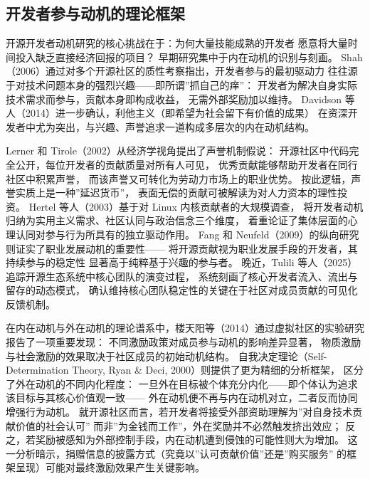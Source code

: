 \subsection{开发者参与动机的理论框架}

开源开发者动机研究的核心挑战在于：为何大量技能成熟的开发者
愿意将大量时间投入缺乏直接经济回报的项目？
早期研究集中于内在动机的识别与刻画。
Shah（2006）通过对多个开源社区的质性考察指出，开发者参与的最初驱动力
往往源于对技术问题本身的强烈兴趣——即所谓”抓自己的痒”：
开发者为解决自身实际技术需求而参与，贡献本身即构成收益，
无需外部奖励加以维持\cite{shah2006motivation}。
Davidson 等人（2014）进一步确认，利他主义（即希望为社会留下有价值的成果）
在资深开发者中尤为突出，与兴趣、声誉追求一道构成多层次的内在动机结构\cite{davidson2014older}。

Lerner 和 Tirole（2002）从经济学视角提出了声誉机制假说：
开源社区中代码完全公开，每位开发者的贡献质量对所有人可见，
优秀贡献能够帮助开发者在同行社区中积累声誉，
而该声誉又可转化为劳动力市场上的职业优势\cite{lerner2002simple}。
按此逻辑，声誉实质上是一种”延迟货币”，
表面无偿的贡献可被解读为对人力资本的理性投资。
Hertel 等人（2003）基于对 Linux 内核贡献者的大规模调查，
将开发者动机归纳为实用主义需求、社区认同与政治信念三个维度，
着重论证了集体层面的心理认同对参与行为所具有的独立驱动作用\cite{hertel2003motivation}。
Fang 和 Neufeld（2009）的纵向研究则证实了职业发展动机的重要性——
将开源贡献视为职业发展手段的开发者，其持续参与的稳定性
显著高于纯粹基于兴趣的参与者\cite{fang2009understanding}。
晚近，Tulili 等人（2025）追踪开源生态系统中核心团队的演变过程，
系统刻画了核心开发者流入、流出与留存的动态模式，
确认维持核心团队稳定性的关键在于社区对成员贡献的可见化反馈机制\cite{tulili2025exploring}。

在内在动机与外在动机的理论谱系中，楼天阳等（2014）通过虚拟社区的实验研究报告了一项重要发现：
不同激励政策对成员参与动机的影响差异显著，
物质激励与社会激励的效果取决于社区成员的初始动机结构\cite{lou2014incentive}。
自我决定理论（Self-Determination Theory, Ryan \& Deci, 2000）\cite{ryan2000self}则提供了更为精细的分析框架，
区分了外在动机的不同内化程度：
一旦外在目标被个体充分内化——即个体认为追求该目标与其核心价值观一致——
外在动机便不再与内在动机对立，二者反而协同增强行为动机。
就开源社区而言，若开发者将接受外部资助理解为”对自身技术贡献价值的社会认可”
而非”为金钱而工作”，外在奖励并不必然触发挤出效应；
反之，若奖励被感知为外部控制手段，内在动机遭到侵蚀的可能性则大为增加。
这一分析暗示，捐赠信息的披露方式（究竟以”认可贡献价值”还是”购买服务”
的框架呈现）可能对最终激励效果产生关键影响\cite{benabou2003intrinsic}。

